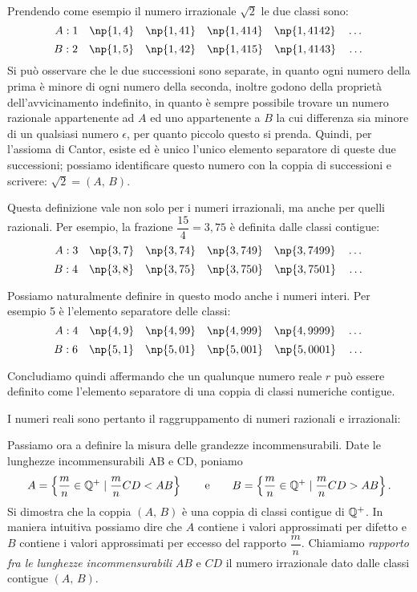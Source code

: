 Prendendo come esempio il numero irrazionale $\sqrt{2}$ le due classi sono:
\[A: 1\quad \np{1,4}\quad \np{1,41}\quad \np{1,414}\quad \np{1,4142}\quad \ldots{}\]
\[B: 2\quad \np{1,5}\quad \np{1,42}\quad \np{1,415}\quad \np{1,4143}\quad \ldots{}\]
Si può osservare che le due successioni sono separate, in quanto ogni numero della prima è minore di ogni numero della seconda, inoltre godono della proprietà dell'avvicinamento indefinito, in quanto è sempre possibile trovare un numero razionale appartenente ad $A$ ed uno appartenente a $B$ la cui differenza sia minore di un qualsiasi numero $\epsilon$, per quanto piccolo questo si prenda.
Quindi, per l'assioma di Cantor, esiste ed è unico l'unico elemento separatore di queste due successioni; possiamo identificare questo numero con la coppia di successioni e scrivere: $\sqrt{2} = (A\text{, }B)$.

Questa definizione vale non solo per i numeri irrazionali, ma anche per quelli razionali. Per esempio, la frazione $\dfrac{15}{4}=3,75$ è definita dalle classi contigue:
\[A: 3\quad \np{3,7}\quad \np{3,74}\quad \np{3,749}\quad \np{3,7499}\quad \ldots{}\]
\[B: 4\quad \np{3,8}\quad \np{3,75}\quad \np{3,750}\quad \np{3,7501}\quad \ldots{}\]

Possiamo naturalmente definire in questo modo anche i numeri interi. Per esempio 5 è l'elemento separatore delle classi:
\[A: 4\quad \np{4,9}\quad \np{4,99}\quad \np{4,999}\quad \np{4,9999}\quad \ldots{}\]
\[B: 6\quad \np{5,1}\quad \np{5,01}\quad \np{5,001}\quad \np{5,0001}\quad \ldots{}\]

Concludiamo quindi affermando che un qualunque numero reale $r$ può essere definito come l'elemento separatore di una coppia di classi numeriche contigue.

\pagebreak

I numeri reali sono pertanto il raggruppamento di numeri razionali e irrazionali:

\begin{figure*}[!htb]
	\centering
\end{figure*}

Passiamo ora a definire la misura delle grandezze incommensurabili.
Date le lunghezze incommensurabili AB e CD, poniamo
\[A=\left\{\dfrac{m}{n}\in\mathbb{Q}^+\mid\dfrac{m}{n}CD<AB\right\}\qquad\text{e}\qquad B=\left\{\dfrac{m}{n}\in\mathbb{Q}^+\mid\dfrac{m}{n}CD>AB\right\}.\]
Si dimostra che la coppia $(A\text{, }B)$ è una coppia di classi contigue di $\mathbb{Q}^+$. In maniera intuitiva possiamo dire che $A$ contiene i valori approssimati per difetto e $B$ contiene i valori approssimati per eccesso del rapporto $\dfrac{m}{n}$.
Chiamiamo \emph{rapporto fra le lunghezze incommensurabili} $AB$ e $CD$ il numero irrazionale dato dalle classi contigue $(A\text{, }B)$.


